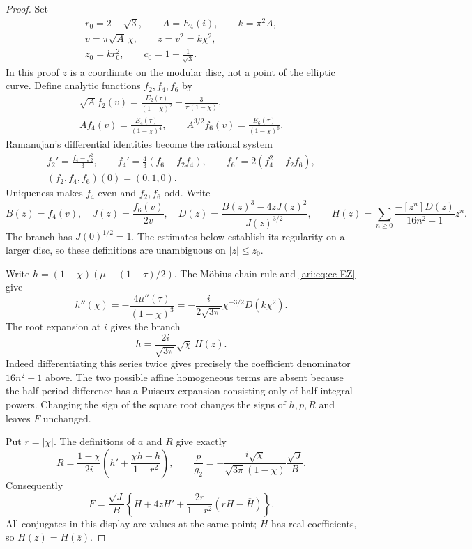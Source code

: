 \begin{proof}
Set
\[
 \begin{gathered}
 r_0=2-\sqrt3,\qquad A=E_4(i),\qquad k=\pi^2A,\\
 v=\pi\sqrt A\,\chi,\qquad z=v^2=k\chi^2,\\
 z_0=kr_0^2,\qquad c_0=1-\frac1{\sqrt3}.
 \end{gathered}
\]
In this proof $z$ is a coordinate on the modular disc, not a
point of the elliptic curve. Define analytic functions $f_2,f_4,f_6$
by
\[
 \begin{gathered}
 \sqrt A f_2(v)=\frac{E_2(\tau)}{(1-\chi)^2}
                         -\frac3{\pi(1-\chi)},\\
 A f_4(v)=\frac{E_4(\tau)}{(1-\chi)^4},\qquad
 A^{3/2} f_6(v)=\frac{E_6(\tau)}{(1-\chi)^6}.
 \end{gathered}
\]
Ramanujan's differential identities become the rational system
\begin{equation}\label{ari:eq:cc-ode}
 \begin{gathered}
 f_2'=\frac{f_4-f_2^2}{3},\qquad
 f_4'=\frac43(f_6-f_2f_4),\qquad
 f_6'=2(f_4^2-f_2f_6),\\
 (f_2,f_4,f_6)(0)=(0,1,0).
 \end{gathered}
\end{equation}
Uniqueness makes $f_4$ even and $f_2,f_6$ odd. Write
\[
 B(z)=f_4(v),\quad J(z)=\frac{f_6(v)}{2v},\quad
 D(z)=\frac{B(z)^3-4zJ(z)^2}{J(z)^{3/2}},\qquad
 H(z)=\sum_{n\ge0}\frac{-[z^n]D(z)}{16n^2-1}z^n.
\]
The branch has $J(0)^{1/2}=1$. The estimates below establish
its regularity on a larger disc, so these definitions are
unambiguous on $|z|\le z_0$.

Write $h=(1-\chi)(\mu-(1-\tau)/2)$. The Möbius chain rule and
\eqref{ari:eq:cc-EZ} give
\[
 h''(\chi)=-\frac{4\mu''(\tau)}{(1-\chi)^3}
       =-\frac{i}{2\sqrt{3\pi}}\chi^{-3/2}D(k\chi^2).
\]
The root expansion at $i$ gives the branch
\begin{equation}\label{ari:eq:cc-h}
 h=\frac{2i}{\sqrt{3\pi}}\sqrt \chi\,H(z).
\end{equation}
Indeed differentiating this series twice gives precisely the
coefficient denominator $16n^2-1$ above. The two possible affine
homogeneous terms are absent because the half-period difference
has a Puiseux expansion consisting only of half-integral powers.
Changing the sign of the square root changes the signs of $h,p,R$
and leaves $F$ unchanged.

Put $r=|\chi|$. The definitions of $a$ and $R$ give exactly
\[
 R=\frac{1-\chi}{2i}
       \left(h'+\frac{\overline \chi h+\overline h}{1-r^2}\right),
 \qquad
 \frac p{g_2}=-\frac{i\sqrt \chi}{\sqrt{3\pi}(1-\chi)}
                         \frac{\sqrt J}{B}.
\]
Consequently
\begin{equation}\label{ari:eq:cc-Fseries}
 F=\frac{\sqrt J}{B}
 \left\{H+4zH'+\frac{2r}{1-r^2}(rH-\overline H)\right\}.
\end{equation}
All conjugates in this display are values at the same point;
$H$ has real coefficients, so $\overline{H(z)}=H(\overline z)$.


\end{proof}
